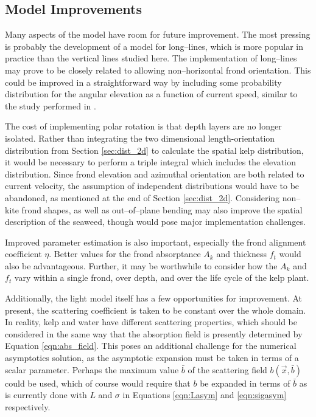 \subsection{Model Improvements}
Many aspects of the model have room for future improvement.
The most pressing is probably the development of a model for long--lines, which
is more popular in practice than the vertical lines studied here.
The implementation of long--lines may prove to be closely related to allowing non--horizontal frond orientation.
This could be improved in a straightforward way by including some
probability distribution for the angular elevation as a function of current speed,
similar to the study performed in \citep{norvik_design_2017}.

The cost of implementing polar rotation is that depth layers are no longer isolated.
Rather than integrating the two dimensional length-orientation distribution from
Section \ref{sec:dist_2d} to calculate the spatial kelp distribution,
it would be necessary to perform a triple integral which includes the elevation distribution.
Since frond elevation and azimuthal orientation are both related to current velocity,
the assumption of independent distributions would have to be abandoned, as mentioned at the end of Section \ref{sec:dist_2d}.
Considering non--kite frond shapes, as well as out--of--plane bending may also improve the spatial description of the seaweed, though would pose major implementation challenges.

Improved parameter estimation is also important, especially the frond alignment coefficient $\eta$.
Better values for the frond absorptance $A_k$ and thickness $f_t$ would also be advantageous.
Further, it may be worthwhile to consider how the $A_k$ and $f_t$ vary within a single frond, over depth, and over the life cycle of the kelp plant.

Additionally, the light model itself has a few opportunities for improvement.
At present, the scattering coefficient is taken to be constant over the whole domain.
In reality, kelp and water have different scattering properties, which should be considered in the same way that the absorption field is presently determined by Equation \eqref{eqn:abs_field}.
This poses an additional challenge for the numerical asymptotics solution, as the asymptotic expansion must be taken in terms of a scalar parameter.
Perhaps the maximum value $\bar{b}$ of the scattering field $b(\vec{x}, \bar{b})$ could be used, which of course would require that $b$ be expanded in terms of $\bar{b}$ as is currently done with $L$ and $\sigma$ in Equations \eqref{eqn:Lasym} and \eqref{eqn:sigasym} respectively.

